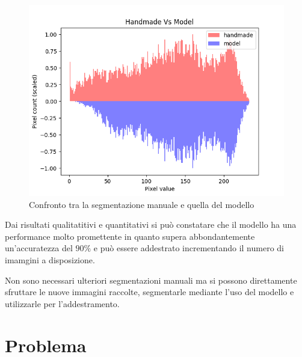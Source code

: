 \begin{figure}[!ht]
	\begin{adjustbox}{width=0.8\columnwidth, center}
    \includegraphics{./images/handmade_vs_model_scaled.png}
  \end{adjustbox}
  \caption{Confronto tra la segmentazione manuale e quella del modello}
  \label{fig:confronto tra la segmentazione manuale e quella del modello}
\end{figure}

Dai risultati qualitatitivi e quantitativi si pu\`o constatare che il modello ha una performance
molto promettente in quanto supera abbondantemente un'accuratezza del $90\%$ e pu\`o essere 
addestrato incrementando il numero di imamgini a disposizione. 

Non sono necessari ulteriori segmentazioni manuali ma si possono direttamente sfruttare
le nuove immagini raccolte, segmentarle mediante l'uso del modello e utilizzarle per l'addestramento.





\section{Problema} %
\label{sec:Problema}



